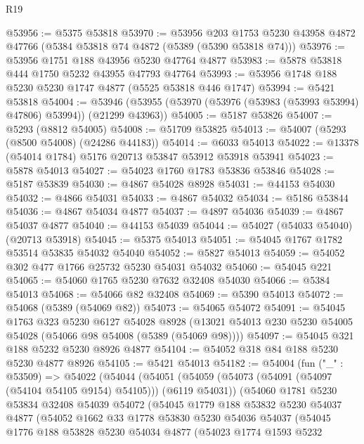 \begin{lexlean}{R19}
\begin{coremodule}
@53956 := @5375 @53818
@53970 := @53956
    @203
    @1753
    @5230
    @43958
    @4872
    @47766
    (@5384 @53818 @74 @4872 (@5389 (@5390 @53818 @74)))
@53976 := @53956 @1751 @188 @43956 @5230 @47764 @4877
@53983 := @5878 @53818 @444 @1750 @5232 @43955 @47793 @47764
@53993 := @53956 @1748 @188 @5230 @5230 @1747 @4877 (@5525 @53818 @446 @1747)
@53994 := @5421 @53818
@54004 := @53946 (@53955 (@53970 (@53976 (@53983 (@53993 @53994) @47806) @53994)) (@21299 @43963))
@54005 := @5187 @53826
@54007 := @5293 (@8812 @54005)
@54008 := @51709 @53825
@54013 := @54007 (@5293 (@8500 @54008) (@24286 @44183))
@54014 := @6033 @54013
@54022 := @13378 (@54014 @1784) @5176 @20713 @53847 @53912 @53918 @53941
@54023 := @5878 @54013
@54027 := @54023 @1760 @1783 @53836 @53846
@54028 := @5187 @53839
@54030 := @4867 @54028 @8928
@54031 := @44153 @54030
@54032 := @4866 @54031
@54033 := @4867 @54032
@54034 := @5186 @53844
@54036 := @4867 @54034 @4877
@54037 := @4897 @54036
@54039 := @4867 @54037 @4877
@54040 := @44153 @54039
@54044 := @54027 (@54033 @54040) (@20713 @53918)
@54045 := @5375 @54013
@54051 := @54045 @1767 @1782 @53514 @53835 @54032 @54040
@54052 := @5827 @54013
@54059 := @54052 @302 @477 @1766 @25732 @5230 @54031 @54032
@54060 := @54045 @221
@54065 := @54060 @1765 @5230 @7632 @32408 @54030
@54066 := @5384 @54013
@54068 := @54066 @82 @32408
@54069 := @5390 @54013
@54072 := @54068 (@5389 (@54069 @82))
@54073 := @54065 @54072
@54091 := @54045
    @1763
    @323
    @5230
    @6127
    @54028
    @8928
    (@13021 @54013 @230 @5230 @54005 @54028 (@54066 @98 @54008 (@5389 (@54069 @98))))
@54097 := @54045 @321 @188 @5232 @5230 @8926 @4877
@54104 := @54052 @318 @84 @188 @5230 @5230 @4877 @8926
@54105 := @5421 @54013
@54182 := @54004
    (fun ("_" : @53509) =>
    @54022
      (@54044
        (@54051
          (@54059 (@54073 (@54091 (@54097 (@54104 @54105 @9154) @54105))) (@6119 @54031))
          (@54060
            @1781
            @5230
            @53834
            @32408
            @54039
            @54072
            (@54045
              @1779
              @188
              @53832
              @5230
              @54037
              @4877
              (@54052
                @1662
                @33
                @1778
                @53830
                @5230
                @54036
                @54037
                (@54045
                  @1776
                  @188
                  @53828
                  @5230
                  @54034
                  @4877
                  (@54023
                    @1774
                    @1593
                    @5232

\end{coremodule}
\end{lexlean}
